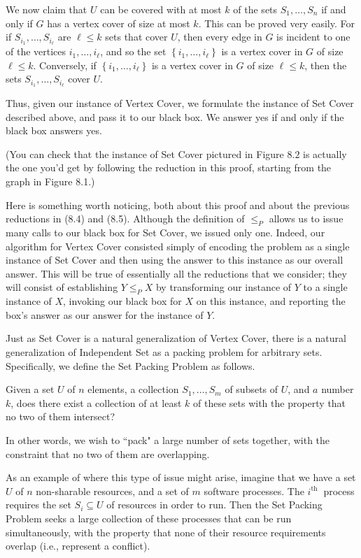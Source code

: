 \documentclass[a4paper, 12pt]{book}
\theoremstyle{dotless}
\begin{document}
We now claim that $U$ can be covered with at most $k$ of the sets $S_{1}, \ldots, S_{n}$ if and only if $G$ has a vertex cover of size at most $k$. This can be proved very easily. For if $S_{i_{1}}, \ldots, S_{i_{\ell}}$ are $\ell \leq k$ sets that cover $U$, then every edge in $G$ is incident to one of the vertices $i_{1}, \ldots, i_{\ell}$, and so the set $\left\{i_{1}, \ldots, i_{\ell}\right\}$ is a vertex cover in $G$ of size $\ell \leq k$. Conversely, if $\left\{i_{1}, \ldots, i_{\ell}\right\}$ is a vertex cover in $G$ of size $\ell \leq k$, then the sets $S_{i_{1}}, \ldots, S_{i_{\ell}}$ cover $U$.

Thus, given our instance of Vertex Cover, we formulate the instance of Set Cover described above, and pass it to our black box. We answer yes if and only if the black box answers yes.

(You can check that the instance of Set Cover pictured in Figure $8.2$ is actually the one you'd get by following the reduction in this proof, starting from the graph in Figure 8.1.)

Here is something worth noticing, both about this proof and about the previous reductions in (8.4) and (8.5). Although the definition of $\leq_{P}$ allows us to issue many calls to our black box for Set Cover, we issued only one. Indeed, our algorithm for Vertex Cover consisted simply of encoding the problem as a single instance of Set Cover and then using the answer to this instance as our overall answer. This will be true of essentially all the reductions that we consider; they will consist of establishing $Y \leq_{P} X$ by transforming our instance of $Y$ to a single instance of $X$, invoking our black box for $X$ on this instance, and reporting the box's answer as our answer for the instance of $Y$.

Just as Set Cover is a natural generalization of Vertex Cover, there is a natural generalization of Independent Set as a packing problem for arbitrary sets. Specifically, we define the Set Packing Problem as follows.

Given a set $U$ of $n$ elements, a collection $S_{1}, \ldots, S_{m}$ of subsets of $U$, and $a$ number $k$, does there exist a collection of at least $k$ of these sets with the property that no two of them intersect?

In other words, we wish to ``pack" a large number of sets together, with the constraint that no two of them are overlapping.

As an example of where this type of issue might arise, imagine that we have a set $U$ of $n$ non-sharable resources, and a set of $m$ software processes. The $i^{\text {th }}$ process requires the set $S_{i} \subseteq U$ of resources in order to run. Then the Set Packing Problem seeks a large collection of these processes that can be run simultaneously, with the property that none of their resource requirements overlap (i.e., represent a conflict).
\end{document}
